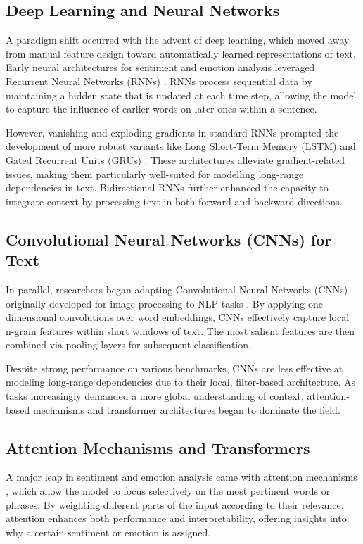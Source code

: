 \subsection*{Deep Learning and Neural Networks}
A paradigm shift occurred with the advent of deep learning, which moved away from manual feature design toward automatically learned representations of text. Early neural architectures for sentiment and emotion analysis leveraged Recurrent Neural Networks (RNNs) \cite{Mikolov:2010wx}. RNNs process sequential data by maintaining a hidden state that is updated at each time step, allowing the model to capture the influence of earlier words on later ones within a sentence.
\newline

However, vanishing and exploding gradients in standard RNNs prompted the development of more robust variants like Long Short-Term Memory (LSTM) \cite{10.1162/neco.1997.9.8.1735} and Gated Recurrent Units (GRUs) \cite{cho2014learningphraserepresentationsusing}. These architectures alleviate gradient-related issues, making them particularly well-suited for modelling long-range dependencies in text. Bidirectional RNNs \cite{1556215} further enhanced the capacity to integrate context by processing text in both forward and backward directions.

\subsection*{Convolutional Neural Networks (CNNs) for Text}
In parallel, researchers began adapting Convolutional Neural Networks (CNNs) originally developed for image processing to NLP tasks \cite{10.5555/2999134.2999257}. By applying one-dimensional convolutions over word embeddings, CNNs effectively capture local n-gram features within short windows of text. The most salient features are then combined via pooling layers for subsequent classification.
\newline

Despite strong performance on various benchmarks, CNNs are less effective at modeling long-range dependencies due to their local, filter-based architecture. As tasks increasingly demanded a more global understanding of context, attention-based mechanisms and transformer architectures began to dominate the field.

\subsection*{Attention Mechanisms and Transformers}
A major leap in sentiment and emotion analysis came with attention mechanisms \cite{Bahdanau2014NeuralMT}, which allow the model to focus selectively on the most pertinent words or phrases. By weighting different parts of the input according to their relevance, attention enhances both performance and interpretability, offering insights into why a certain sentiment or emotion is assigned.
\newline

